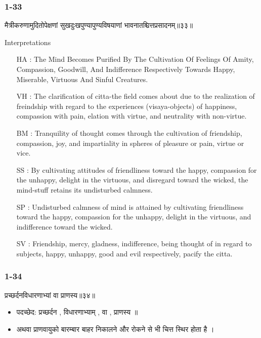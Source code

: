 \begin{frame}[fragile]\frametitle{1-33}
\begin{sanskrit}
मैत्रीकरुणामुदितोपेक्षणां सुखदुःखपुण्यापुण्यविषयाणां भावनातश्चित्तप्रसादनम्॥३३॥
\end{sanskrit}

Interpretations
\begin{itemize}	
\item [HA]: The Mind Becomes Purified By The Cultivation Of Feelings Of Amity, Compassion, Goodwill, And Indifference Respectively Towards Happy, Miserable, Virtuous And Sinful Creatures.
\item [VH]: The clarification of citta-the field comes about due to the realization of freindship with regard to the experiences (visaya-objects) of happiness, compassion with pain, elation with virtue, and neutrality with non-virtue.
\item [BM]: Tranquility of thought comes through the cultivation of friendship, compassion, joy, and impartiality in spheres of pleasure or pain, virtue or vice.
\item [SS]: By cultivating attitudes of friendliness toward the happy, compassion for the unhappy, delight in the virtuous, and disregard toward the wicked, the mind-stuff retains its undisturbed calmness.
\item [SP]: Undisturbed calmness of mind is attained by cultivating friendliness toward the happy, compassion for the unhappy, delight in the virtuous, and indifference toward the wicked.
\item [SV]: Friendship, mercy, gladness, indifference, being thought of in regard to subjects, happy, unhappy, good and evil respectively, pacify the citta. 
\end{itemize}
\end{frame}

\begin{frame}[fragile]\frametitle{1-34}
\begin{sanskrit}
प्रच्छर्दनविधारणाभ्यां वा प्राणस्य॥३४॥
\end{sanskrit}

\begin{itemize}
\item पदच्छेद: प्रच्छर्दन , विधारणाभ्याम् , वा , प्राणस्य ॥
\item अथवा प्राणवायुको बारम्बार बाहर निकालने और रोकने से भी चित्त स्थिर होता है ।
\end{itemize}
	
\end{frame}


